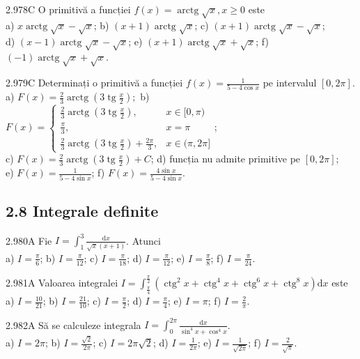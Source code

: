\documentclass[11pt]{article}
\begin{document}
2.978C O primitivă a funcției $f(x)=\operatorname{arctg} \sqrt{x}, x \geq 0$ este\\ a) $x \operatorname{arctg} \sqrt{x}-\sqrt{x}$; b) $(x+1) \operatorname{arctg} \sqrt{x}$; c) $(x+1) \operatorname{arctg} \sqrt{x}-\sqrt{x}$;\\ d) $(x-1) \operatorname{arctg} \sqrt{x}-\sqrt{x}$; e) $(x+1) \operatorname{arctg} \sqrt{x}+\sqrt{x}$; f) $(-1) \operatorname{arctg} \sqrt{x}+\sqrt{x}$.

2.979C Determinați o primitivă a funcției $f(x)=\frac{1}{5-4 \cos x}$ pe intervalul $[0,2 \pi]$.\\ a) $F(x)=\frac{2}{3} \operatorname{arctg}\left(3 \operatorname{tg} \frac{x}{2}\right) ;$ b) $F(x)= \begin{cases}\frac{2}{3} \operatorname{arctg}\left(3 \operatorname{tg} \frac{x}{2}\right), & x \in[0, \pi) \\ \frac{\pi}{3}, & x=\pi \\ \frac{2}{3} \operatorname{arctg}\left(3 \operatorname{tg} \frac{x}{2}\right)+\frac{2 \pi}{3}, & x \in(\pi, 2 \pi]\end{cases}$;\\ c) $F(x)=\frac{2}{3} \operatorname{arctg}\left(3 \operatorname{tg} \frac{x}{2}\right)+C$; d) funcția nu admite primitive pe $[0,2 \pi]$;\\ e) $F(x)=\frac{1}{5-4 \sin x}$; f) $F(x)=\frac{4 \sin x}{5-4 \sin x}$.

\subsection*{2.8 Integrale definite}
2.980A Fie $I=\int_{1}^{3} \frac{\mathrm{d} x}{\sqrt{x}(x+1)}$. Atunci\\ a) $I=\frac{\pi}{6}$; b) $I=\frac{\pi}{12}$; c) $I=\frac{\pi}{18}$; d) $I=\frac{\pi}{12}$; e) $I=\frac{\pi}{8}$; f) $I=\frac{\pi}{24}$.

2.981A Valoarea integralei $I=\int_{\frac{\pi}{4}}^{\frac{\pi}{2}}\left(\operatorname{ctg}^{2} x+\operatorname{ctg}^{4} x+\operatorname{ctg}^{6} x+\operatorname{ctg}^{8} x\right) \mathrm{d} x$ este\\ a) $I=\frac{10}{21}$; b) $I=\frac{21}{10}$; c) $I=\frac{\pi}{2}$; d) $I=\frac{\pi}{4}$; e) $I=\pi$; f) $I=\frac{2}{\pi}$.

2.982A Să se calculeze integrala $I=\int_{0}^{2 \pi} \frac{\mathrm{d} x}{\sin ^{4} x+\cos ^{4} x}$.\\ a) $I=2 \pi$; b) $I=\frac{\sqrt{2}}{2 \pi}$; c) $I=2 \pi \sqrt{2}$; d) $I=\frac{1}{2 \pi}$; e) $I=\frac{1}{\sqrt{2 \pi}}$; f) $I=\frac{2}{\sqrt{\pi}}$.
\end{document}
